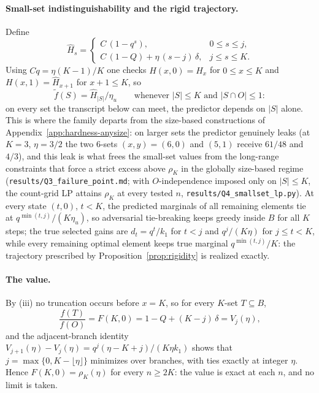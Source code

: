 \paragraph{Small-set indistinguishability and the rigid trajectory.}
Define
\[
  \widehat H_s=\begin{cases}C\,(1-q^{s}),&0\le s\le j,\\
    C\,(1-Q)+\eta\,(s-j)\,\delta,&j\le s\le K.\end{cases}
\]
Using $Cq=\eta(K-1)/K$ one checks $H(x,0)=\widehat H_{x}$ for $0\le x\le K$
and $H(x,1)=\widehat H_{x+1}$ for $x+1\le K$, so
\[
  \tilde f(S)=\widehat H_{|S|}/\eta_u
  \qquad\text{whenever } |S|\le K \text{ and } |S\cap O|\le1:
\]
on every set the transcript below can meet, the predictor depends on
$|S|$ alone.  This is where the family departs from the size-based
constructions of Appendix~\ref{app:hardness-anysize}: on larger sets the
predictor genuinely leaks (at $K=3$, $\eta=3/2$ the two $6$-sets
$(x,y)=(6,0)$ and $(5,1)$ receive $61/48$ and $4/3$), and this leak is
what frees the small-set values from the long-range constraints that
force a strict excess above $\rho_K$ in the globally size-based regime
(\texttt{results/Q3\_failure\_point.md}; with $O$-independence imposed
only on $|S|\le K$, the count-grid LP attains $\rho_K$ at every tested
$n$, \texttt{results/Q4\_smallset\_lp.py}).
At every state $(t,0)$, $t<K$, the predicted marginals of all remaining
elements tie at $q^{\min(t,j)}/(K\eta_u)$, so adversarial tie-breaking
keeps greedy inside $B$ for all $K$ steps; the true selected gains are
$d_t=q^{t}/k_1$ for $t<j$ and $q^{j}/(K\eta)$ for $j\le t<K$, while every
remaining optimal element keeps true marginal $q^{\min(t,j)}/K$: the
trajectory prescribed by Proposition~\ref{prop:rigidity} is realized
exactly.

\paragraph{The value.}
By (iii) no truncation occurs before $x=K$, so for every $K$-set
$T\subseteq B$,
\[
  \frac{f(T)}{f(O)}=F(K,0)=1-Q+(K-j)\,\delta=V_{j}(\eta),
\]
and the adjacent-branch identity
$V_{j+1}(\eta)-V_{j}(\eta)=q^{j}(\eta-K+j)/(K\eta k_1)$ shows that
$j=\max\{0,K-\lfloor\eta\rfloor\}$ minimizes over branches, with ties
exactly at integer $\eta$.  Hence $F(K,0)=\rho_K(\eta)$ for every
$n\ge2K$: the value is exact at each $n$, and no limit is taken.

